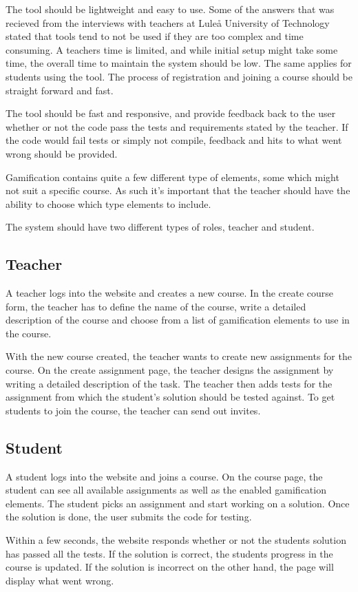 The tool should be lightweight and easy to use. Some of the answers that was recieved from the interviews with teachers at Luleå University of Technology stated that tools tend to not be used if they are too complex and time consuming. A teachers time is limited, and while initial setup might take some time, the overall time to maintain the system should be low. The same applies for students using the tool. The process of registration and joining a course should be straight forward and fast.

The tool should be fast and responsive, and provide feedback back to the user whether or not the code pass the tests and requirements stated by the teacher. If the code would fail tests or simply not compile, feedback and hits to what went wrong should be provided. 

Gamification contains quite a few different type of elements, some which might not suit a specific course. As such it's important that the teacher should have the ability to choose which type elements to include.

The system should have two different types of roles, teacher and student.

\subsection*{Teacher}
A teacher logs into the website and creates a new course. In the create course form, the teacher has to define the name of the course, write a detailed description of the course and choose from a list of gamification elements to use in the course. 

With the new course created, the teacher wants to create new assignments for the course. On the create assignment page, the teacher designs the assignment by writing a detailed description of the task. The teacher then adds tests for the assignment from which the student's solution should be tested against. To get students to join the course, the teacher can send out invites.

\subsection*{Student}
A student logs into the website and joins a course. On the course page, the student can see all available assignments as well as the enabled gamification elements. The student picks an assignment and start working on a solution. Once the solution is done, the user submits the code for testing.

Within a few seconds, the website responds whether or not the students solution has passed all the tests. If the solution is correct, the students progress in the course is updated. If the solution is incorrect on the other hand, the page will display what went wrong.